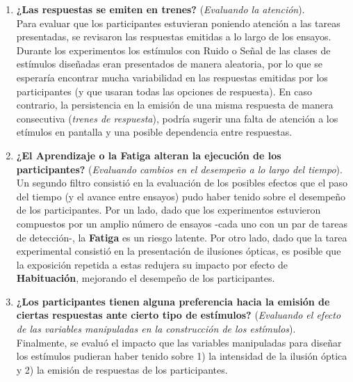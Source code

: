 \begin{enumerate}
	\item \textbf{¿Las respuestas se emiten en trenes?} (\textit{Evaluando la atención}).\\

Para evaluar que los participantes estuvieran poniendo atención a las tareas presentadas, se revisaron las respuestas emitidas a lo largo de los ensayos.\\

Durante los experimentos los estímulos con Ruido o Señal de las clases de estímulos diseñadas eran presentados de manera aleatoria, por lo que se esperaría encontrar mucha variabilidad en las respuestas emitidas por los participantes (y que usaran todas las opciones de respuesta). En caso contrario, la persistencia en la emisión de una misma respuesta de manera consecutiva (\textit{trenes de respuesta}), podría sugerir una falta de atención a los etímulos en pantalla y una posible dependencia entre respuestas.\\

	\item \textbf{¿El Aprendizaje o la Fatiga alteran la ejecución de los participantes?}  (\textit{Evaluando cambios en el desempeño a lo largo del tiempo}).\\

Un segundo filtro consistió en la evaluación de los posibles efectos que el paso del tiempo (y el avance entre ensayos) pudo haber tenido sobre el desempeño de los participantes. Por un lado, dado que los experimentos estuvieron compuestos por un amplio número de ensayos -cada uno con un par de tareas de detección-, la \textbf{Fatiga} es un riesgo latente. Por otro lado, dado que la tarea experimental consistió en la presentación de ilusiones ópticas, es posible que la exposición repetida a estas redujera su impacto por efecto de \textbf{Habituación}, mejorando el desempeño de los participantes.\\

	\item \textbf{¿Los participantes tienen alguna preferencia hacia la emisión de ciertas respuestas ante cierto tipo de estímulos?} (\textit{Evaluando el efecto de las variables manipuladas en la construcción de los estímulos}).\\

Finalmente, se evaluó el impacto que las variables manipuladas para diseñar los estímulos pudieran haber tenido sobre 1) la intensidad de la ilusión óptica y 2) la emisión de respuestas de los participantes.\\
\end{enumerate}

